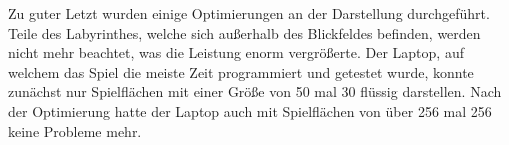 Zu guter Letzt wurden einige Optimierungen an der Darstellung durchgeführt. Teile des Labyrinthes, welche sich außerhalb des Blickfeldes befinden, werden nicht mehr beachtet, was die Leistung enorm vergrößerte. Der Laptop, auf welchem das Spiel die meiste Zeit programmiert und getestet wurde, konnte zunächst nur Spielflächen mit einer Größe von 50 mal 30 flüssig darstellen. Nach der Optimierung hatte der Laptop auch mit Spielflächen von über 256 mal 256 keine Probleme mehr. 